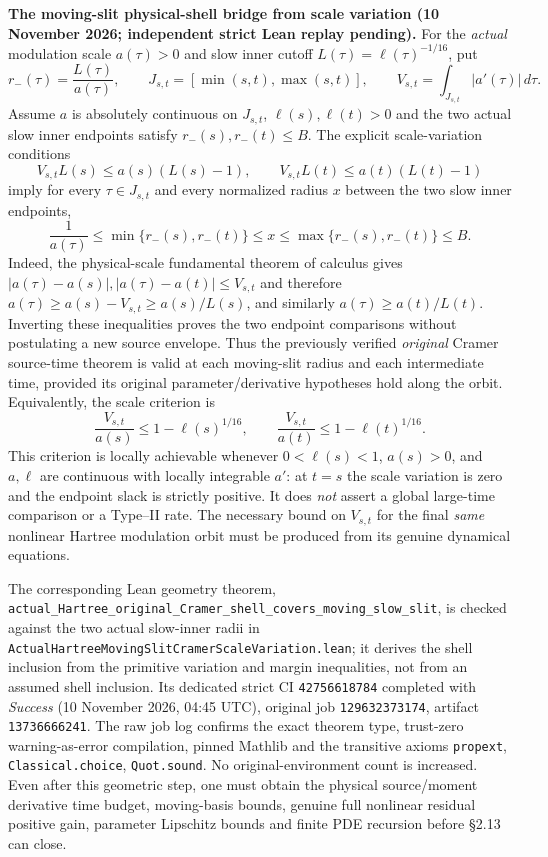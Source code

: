 \documentclass[11pt]{amsart}
\begin{document}
\medskip
\noindent\textbf{The moving-slit physical-shell bridge from scale variation
(10 November 2026; independent strict Lean replay pending).}
For the \emph{actual} modulation scale $a(\tau)>0$ and slow inner
cutoff $L(\tau)=\ell(\tau)^{-1/16}$, put
\[
 r_-(\tau)=\frac{L(\tau)}{a(\tau)},\qquad
 J_{s,t}=[\min(s,t),\max(s,t)],\qquad
 V_{s,t}=\int_{J_{s,t}}|a'(\tau)|\,d\tau.
\]
Assume $a$ is absolutely continuous on $J_{s,t}$,
$\ell(s),\ell(t)>0$ and the two actual slow inner endpoints
satisfy $r_-(s),r_-(t)\le B$. The explicit scale-variation conditions
\[
 \boxed{\quad
 V_{s,t} L(s)\le a(s)(L(s)-1),\qquad
 V_{s,t} L(t)\le a(t)(L(t)-1)
 \quad}
\]
imply for every $\tau\in J_{s,t}$ and every normalized radius
$x$ between the two slow inner endpoints,
\[
 \boxed{\quad
 \frac{1}{a(\tau)}
 \le \min\{r_-(s),r_-(t)\}
 \le x \le \max\{r_-(s),r_-(t)\}\le B .
 \quad}
\]
Indeed, the physical-scale fundamental theorem of calculus gives
$|a(\tau)-a(s)|,|a(\tau)-a(t)|\le V_{s,t}$ and therefore
$a(\tau)\ge a(s)-V_{s,t}\ge a(s)/L(s)$, and similarly
$a(\tau)\ge a(t)/L(t)$. Inverting these inequalities proves the
two endpoint comparisons without postulating a new source envelope.
Thus the previously verified \emph{original} Cramer source-time
theorem is valid at each moving-slit radius and each intermediate
time, provided its original parameter/derivative hypotheses hold
along the orbit. Equivalently, the scale criterion is
\[
 \frac{V_{s,t}}{a(s)}\le 1-\ell(s)^{1/16},
 \qquad
 \frac{V_{s,t}}{a(t)}\le 1-\ell(t)^{1/16}.
\]
This criterion is locally achievable whenever $0<\ell(s)<1$,
$a(s)>0$, and $a,\ell$ are continuous with locally integrable
$a'$: at $t=s$ the scale variation is zero and the endpoint
slack is strictly positive. It does \emph{not} assert a global
large-time comparison or a Type--II rate. The necessary bound on
$V_{s,t}$ for the final \emph{same} nonlinear Hartree modulation
orbit must be produced from its genuine dynamical equations.

The corresponding Lean geometry theorem,
\texttt{actual\_Hartree\_original\_Cramer\_shell\_covers\_moving\_slow\_slit},
is checked against the two actual slow-inner radii in
\texttt{ActualHartreeMovingSlitCramerScaleVariation.lean}; it
derives the shell inclusion from the primitive variation and margin
inequalities, not from an assumed shell inclusion. Its dedicated
strict CI \texttt{42756618784} completed with \emph{Success}
(10 November 2026, 04:45 UTC), original job
\texttt{129632373174}, artifact \texttt{13736666241}.
The raw job log confirms the exact theorem type, trust-zero
warning-as-error compilation, pinned Mathlib and the transitive
axioms \texttt{propext}, \texttt{Classical.choice}, \texttt{Quot.sound}. No original-environment
count is increased. Even after this geometric step, one must obtain
the physical source/moment derivative time budget, moving-basis
bounds, genuine full nonlinear residual positive gain, parameter
Lipschitz bounds and finite PDE recursion before §2.13 can close.
\end{document}
